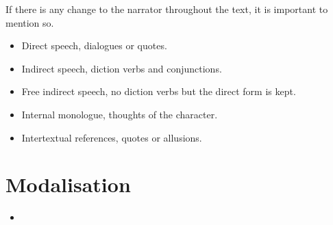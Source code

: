 \documentclass{article}
\begin{document}
If there is any change to the narrator throughout the text, it is important to
mention so.

\begin{itemize}
    \item Direct speech, dialogues or quotes.
    \item Indirect speech, diction verbs and conjunctions.
    \item Free indirect speech, no diction verbs but the direct form is kept.
    \item Internal monologue, thoughts of the character.
    \item Intertextual references, quotes or allusions.
\end{itemize}

\section*{Modalisation}

\begin{itemize}
    \item 
\end{itemize}
\end{document}
